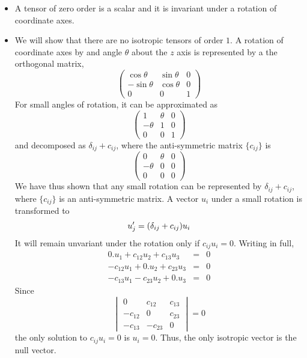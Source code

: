 \begin{itemize}
\item A tensor of zero order is a scalar and it is invariant under a rotation of coordinate axes. 

\item We will show that there are no isotropic tensors of order $1$. A rotation of coordinate axes by and angle $\theta$ about the $z$ axis is represented by a the orthogonal matrix,
\[
\begin{pmatrix}
\cos\theta & \sin\theta & 0 \\
-\sin\theta & \cos\theta & 0 \\
0 & 0 & 1
\end{pmatrix}
\]
For small angles of rotation, it can be approximated as
\[
\begin{pmatrix}
1 & \theta & 0 \\
-\theta & 1 & 0 \\
0 & 0 & 1
\end{pmatrix}
\]
and decomposed as $\delta_{ij} + c_{ij}$, where the anti-symmetric matrix $\{c_{ij}\}$ is
\[
\begin{pmatrix}
0 & \theta & 0 \\
-\theta & 0 & 0 \\
0 & 0 & 0
\end{pmatrix}
\]
We have thus shown that any small rotation can be represented by $\delta_{ij} + c_{ij}$, where $\{c_{ij}\}$ is an anti-symmetric matrix. A vector $u_i$ under a small rotation is
transformed to
\[
u_j^\prime = (\delta_{ij} + c_{ij})u_i
\]
It will remain unvariant under the rotation only if $c_{ij}u_i = 0$. Writing in full,
\begin{eqnarray*}
 0.u_1 + c_{12}u_2 + c_{13}u_3 &=& 0 \\
-c_{12}u_1 + 0.u_2 + c_{23}u_3 &=& 0 \\
-c_{13}u_1 - c_{23}u_2 + 0.u_3 &=& 0
\end{eqnarray*}
Since
\[
\begin{vmatrix}
 0 & c_{12} & c_{13} \\
-c_{12} & 0 & c_{23} \\
-c_{13} & -c_{23} & 0
\end{vmatrix} = 0
\]
the only solution to $c_{ij}u_i = 0$ is $u_i = 0$. Thus, the only isotropic vector is the null vector.


\end{itemize}
